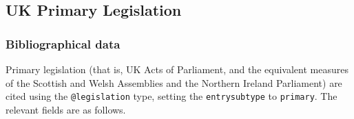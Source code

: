 \documentclass[a5paper,fontsize=9pt,DIV=1]{scrartcl}
\begin{document}
\subsection{UK Primary Legislation}

\subsubsection{Bibliographical data}
Primary legislation (that is, UK Acts of Parliament, and the
equivalent measures of the Scottish and Welsh Assemblies and the
Northern Ireland Parliament) are cited using the \texttt{@legislation}
type, setting the \texttt{entrysubtype} to \texttt{primary}. The
relevant fields are as follows.
\end{document}
